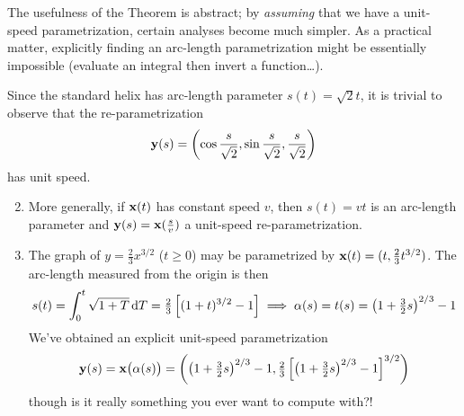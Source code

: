 The usefulness of the Theorem is abstract; by \emph{assuming} that we have a unit-speed parametrization, certain analyses become much simpler. As a practical matter, explicitly finding an arc-length parametrization might be essentially impossible (evaluate an integral then invert a function\ldots).

\begin{examples}{}{}
	\exstart Since the standard helix has arc-length parameter $s(t)=\sqrt 2t$, it is trivial to observe that the re-parametrization
	\[
		{\mathbf{y}}(s)=\left(\cos\frac s{\sqrt 2},\sin\frac s{\sqrt 2},\frac s{\sqrt 2}\right)
	\]
	has unit speed.
	\begin{enumerate}\setcounter{enumi}{1}
	  \item More generally, if ${\mathbf{x}}(t)$ has constant speed $v$, then $s(t)=vt$ is an arc-length parameter and ${\mathbf{y}}(s)={\mathbf{x}}(\tfrac sv)$ a unit-speed re-parametrization.
	  \item The graph of $y=\frac 23x^{3/2}$ ($t\ge 0$) may be parametrized by ${\mathbf{x}}(t)=(t,\frac 23t^{3/2})$. The arc-length measured from the origin is then
	  \[
	  	s(t)=\int_0^t\sqrt{1+T}\,\mathrm{d} T =\tfrac 23\left[(1+t)^{3/2}-1\right] \implies \alpha(s)=t(s)=\left(1+\tfrac 32s\right)^{2/3}-1
	  \]
	  We've obtained an explicit unit-speed parametrization
	  \[
	  	{\mathbf{y}}(s)={\mathbf{x}}\bigl(\alpha(s)\bigr) =\left(\left(1+\tfrac 32s\right)^{2/3}-1,\tfrac 23\left[\left(1+\tfrac 32s\right)^{2/3}-1\right]^{3/2}\right)
	  \]
	  though is it really something you ever want to compute with?!
	
		\goodbreak
		

\end{enumerate}
\end{examples}
